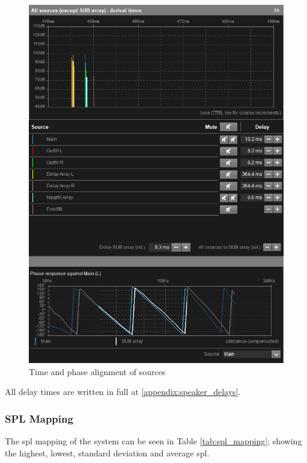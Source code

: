         \begin{figure}[H]
            \centering
            \includegraphics{Images/delay_alignment.png}
            \caption{Time and phase alignment of sources}
            \label{fig:delay_alignment}
        \end{figure}

        All delay times are written in full at \ref{appendix:speaker_delays}.
        
    \subsubsection{SPL Mapping}
     The \acrshort{spl} mapping of the system can be seen in Table \ref{tab:spl_mapping}; showing the highest, lowest, standard deviation and average \acrshort{spl}.
     
